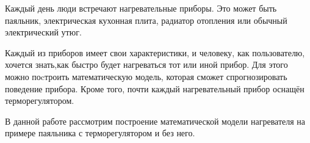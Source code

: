\Introduction

Каждый день люди встречают нагревательные приборы. 
Это может быть паяльник, электрическая кухонная плита, радиатор отопления или обычный электрический утюг.

Каждый из приборов имеет свои характеристики, и человеку, как пользователю, хочется знать,как быстро будет нагреваться тот или иной прибор. Для этого можно поcтроить математическую модель, которая сможет спрогнозировать поведение прибора. Кроме того, почти каждый нагревательный прибор оснащён терморегулятором.

В данной работе рассмотрим построение математической модели нагревателя на примере паяльника с терморегулятором и без него.